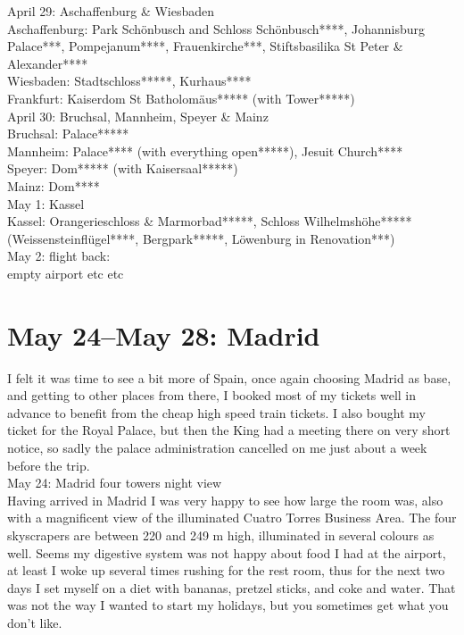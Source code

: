April 29: Aschaffenburg \& Wiesbaden\\
Aschaffenburg: Park Sch\"onbusch and Schloss Sch\"onbusch****, Johannisburg Palace***, Pompejanum****, Frauenkirche***, Stiftsbasilika St Peter \& Alexander****\\
Wiesbaden: Stadtschloss*****, Kurhaus****\\
Frankfurt: Kaiserdom St Batholom\"aus***** (with Tower*****)\\

April 30: Bruchsal, Mannheim, Speyer \& Mainz\\
Bruchsal: Palace*****\\
Mannheim: Palace**** (with everything open*****), Jesuit Church****\\
Speyer: Dom***** (with Kaisersaal*****)\\
Mainz: Dom****\\

May 1: Kassel\\
Kassel: Orangerieschloss \& Marmorbad*****, Schloss Wilhelmsh\"ohe***** (Weissensteinfl\"ugel****, Bergpark*****, L\"owenburg in Renovation***)\\

May 2: flight back:\\
empty airport etc etc

\section{May 24--May 28: Madrid}
\label{Madrid2017}

I felt it was time to see a bit more of Spain, once again choosing Madrid as base, and getting to other places from there, I booked most of my tickets well in advance to benefit from the cheap high speed train tickets. I also bought my ticket for the Royal Palace, but then the King had a meeting there on very short notice, so sadly the palace administration cancelled on me just about a week before the trip.\\

May 24: Madrid four towers night view\\
Having arrived in Madrid I was very happy to see how large the room was, also with a magnificent view of the illuminated Cuatro Torres Business Area. The four skyscrapers are between 220 and 249 m high, illuminated in several colours as well. Seems my digestive system was not happy about food I had at the airport, at least I woke up several times rushing for the rest room, thus for the next two days I set myself on a diet with bananas, pretzel sticks, and coke and water. That was not the way I wanted to start my holidays, but you sometimes get what you don't like.

